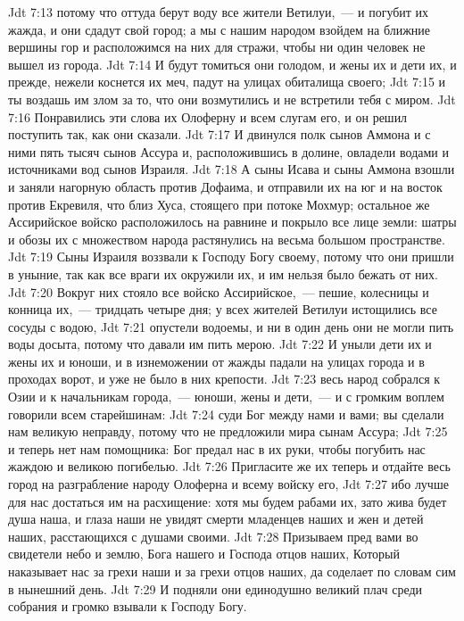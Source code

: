 \vs Jdt 7:13 потому что оттуда берут воду все жители Ветилуи,~--- и погубит их жажда, и они сдадут свой город; а мы с нашим народом взойдем на ближние вершины гор и расположимся на них для стражи, чтобы ни один человек не вышел из города.
\vs Jdt 7:14 И будут томиться они голодом, и жены их и дети их, и прежде, нежели коснется их меч, падут на улицах обиталища своего;
\vs Jdt 7:15 и ты воздашь им злом за то, что они возмутились и не встретили тебя с миром.
\vs Jdt 7:16 Понравились эти слова их Олоферну и всем слугам его, и он решил поступить так, как они сказали.
\vs Jdt 7:17 И двинулся полк сынов Аммона и с ними пять тысяч сынов Ассура и, расположившись в долине, овладели водами и источниками вод сынов Израиля.
\vs Jdt 7:18 А сыны Исава и сыны Аммона взошли и заняли нагорную область против Дофаима, и отправили  их на юг и на восток против Екревиля, что близ Хуса, стоящего при потоке Мохмур; остальное же Ассирийское войско расположилось на равнине и покрыло все лице земли: шатры и обозы их с множеством народа растянулись на весьма большом пространстве.
\rsbpar\vs Jdt 7:19 Сыны Израиля воззвали к Господу Богу своему, потому что они пришли в уныние, так как все враги их окружили их, и им нельзя было бежать от них.
\vs Jdt 7:20 Вокруг них стояло все войско Ассирийское,~--- пешие, колесницы и конница их,~--- тридцать четыре дня; у всех жителей Ветилуи истощились все сосуды с водою,
\vs Jdt 7:21 опустели водоемы, и ни в один день они не могли пить воды досыта, потому что давали им пить мерою.
\vs Jdt 7:22 И уныли дети их и жены их и юноши, и в изнеможении от жажды падали на улицах города и в проходах ворот, и уже не было в них крепости.
\vs Jdt 7:23  весь народ собрался к Озии и к начальникам города,~--- юноши, жены и дети,~--- и с громким воплем говорили всем старейшинам:
\vs Jdt 7:24 суди Бог между нами и вами; вы сделали нам великую неправду, потому что не предложили мира сынам Ассура;
\vs Jdt 7:25 и теперь нет нам помощника: Бог предал нас в их руки, чтобы погубить нас жаждою и великою погибелью.
\vs Jdt 7:26 Пригласите же их теперь и отдайте весь город на разграбление народу Олоферна и всему войску его,
\vs Jdt 7:27 ибо лучше для нас достаться им на расхищение: хотя мы будем рабами их, зато жива будет душа наша, и глаза наши не увидят смерти младенцев наших и жен и детей наших, расстающихся с душами своими.
\vs Jdt 7:28 Призываем пред вами во свидетели небо и землю, Бога нашего и Господа отцов наших, Который наказывает нас за грехи наши и за грехи отцов наших, да соделает по словам сим в нынешний день.
\vs Jdt 7:29 И подняли они единодушно великий плач среди собрания и громко взывали к Господу Богу.
